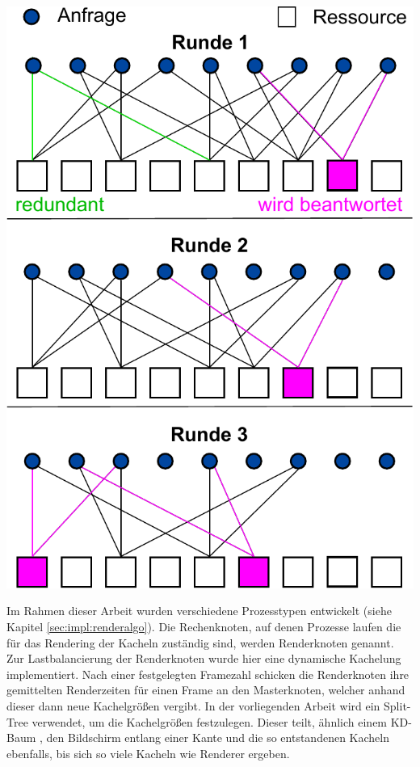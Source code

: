 \begin{Bild}
  \includegraphics[scale=0.55]{images/ccollision2.pdf}
\end{Bild}

Im Rahmen dieser Arbeit wurden verschiedene Prozesstypen entwickelt (siehe Kapitel \ref{sec:impl:renderalgo}). Die Rechenknoten, auf denen Prozesse laufen die für das Rendering der Kacheln zuständig sind, werden Renderknoten genannt. Zur Lastbalancierung der Renderknoten wurde hier eine dynamische Kachelung implementiert. Nach einer festgelegten Framezahl schicken die Renderknoten ihre gemittelten Renderzeiten für einen Frame an den Masterknoten, welcher anhand dieser dann neue Kachelgrößen vergibt. In der vorliegenden Arbeit wird ein Split-Tree verwendet, um die Kachelgrößen festzulegen. Dieser teilt, ähnlich einem KD-Baum \cite{RTR3}, den Bildschirm entlang einer Kante und die so entstandenen Kacheln ebenfalls, bis sich so viele Kacheln wie Renderer ergeben. 

